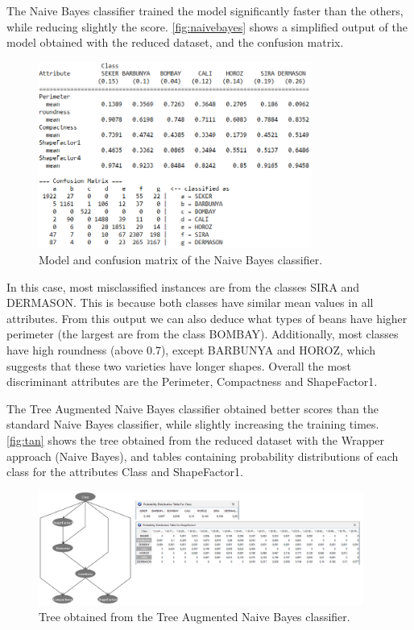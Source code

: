 \documentclass[a4paper,11pt]{article}
\begin{document}
The Naive Bayes classifier trained the model significantly faster than the others, while reducing slightly the score. \autoref{fig:naivebayes} shows a simplified output of the model obtained with the reduced dataset, and the confusion matrix.

\begin{figure}[h]
\centering
\includegraphics[width=0.8\textwidth]{naivebayes}
\caption{Model and confusion matrix of the Naive Bayes classifier.}
\label{fig:naivebayes}
\end{figure}

In this case, most misclassified instances are from the classes SIRA and DERMASON. This is because both classes have similar mean values in all attributes. From this output we can also deduce what types of beans have higher perimeter (the largest are from the class BOMBAY). Additionally, most classes have high roundness (above 0.7), except BARBUNYA and HOROZ, which suggests that these two varieties have longer shapes. Overall the most discriminant attributes are the Perimeter, Compactness and ShapeFactor1.

The Tree Augmented Naive Bayes classifier obtained better scores than the standard Naive Bayes classifier, while slightly increasing the training times. \autoref{fig:tan} shows the tree obtained from the reduced dataset with the Wrapper approach (Naive Bayes), and tables containing probability distributions of each class for the attributes Class and ShapeFactor1.

\begin{figure}[h]
\centering
\includegraphics[width=0.95\textwidth]{TAN}
\caption{Tree obtained from the Tree Augmented Naive Bayes classifier.}
\label{fig:tan}
\end{figure}
\end{document}
